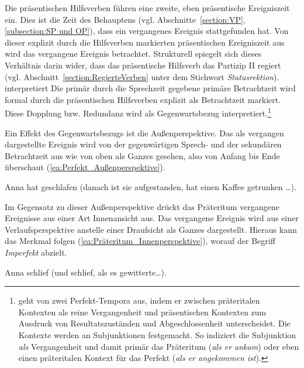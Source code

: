 Die präsentischen Hilfsverben führen eine zweite, eben präsentische Ereigniszeit ein. Dies ist die Zeit des Behauptens (vgl. Abschnitte~\ref{section:VP}, \ref{subsection:SP und OP}), dass ein vergangenes Ereignis stattgefunden hat. Von dieser explizit durch die Hilfsverben markierten präsentischen Ereigniszeit aus wird das vergangene Ereignis betrachtet. Strukturell spiegelt sich dieses Verhältnis darin wider, dass das präsentische Hilfsverb das Partizip II regiert (vgl. Abschnitt~\ref{section:RegierteVerben} unter dem Stichwort \textit{Statusrektion}). \citet[243]{Welke2005Temp} interpretiert  Die primär durch die Sprechzeit gegebene primäre Betrachtzeit wird formal durch die präsentischen Hilfsverben explizit als Betrachtzeit markiert. Diese Dopplung bzw. Redundanz wird als Gegenwartsbezug interpretiert.\footnote{\citet[44, 51]{Baeuerle2015} geht von zwei Perfekt-Tempora aus, indem er zwischen präteritalen Kontexten als reine Vergangenheit und präsentischen Kontexten zum Ausdruck von Resultatszuständen und Abgeschlossenheit unterscheidet. Die Kontexte werden an Subjunktionen festgemacht. So indiziert die Subjunktion \textit{als} Vergangenheit und damit primär das Präteritum (\textit{als er ankam}) oder eben einen präteritalen Kontext für das Perfekt (\textit{als er angekommen ist}).}

Ein Effekt des Gegenwartsbezugs ist die Außenperspektive. Das als vergangen dargestellte Ereignis wird von der gegenwärtigen Sprech- und der sekundären Betrachtzeit aus wie von oben als Ganzes gesehen, also von Anfang bis Ende überschaut (\ref{ea:Perfekt_Außenperspektive}). 

\ea \label{ea:Perfekt_Außenperspektive} Anna hat geschlafen (danach ist sie aufgestanden, hat einen Kaffee getrunken \ldots{}).
\z 

Im Gegensatz zu dieser Außenperspektive drückt das Präteritum vergangene Ereignisse aus einer Art Innenansicht aus. Das vergangene Ereignis wird aus einer Verlaufsperspektive anstelle einer Draufsicht als Ganzes dargestellt. Hieraus kann das Merkmal  folgen (\ref{ea:Präteritum_Innenperspektive}), worauf der Begriff \textit{Imperfekt} abzielt.   

\ea \label{ea:Präteritum_Innenperspektive} Anna schlief (und schlief, als es gewitterte\ldots).
\z 

